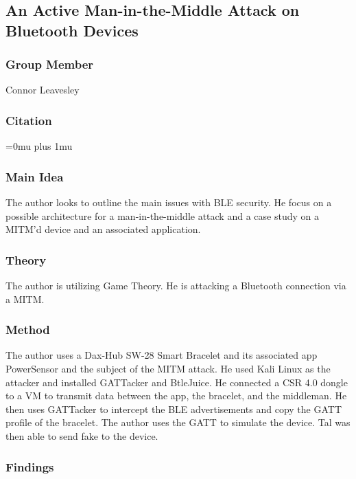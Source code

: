 \noindent
\subsection{An Active Man-in-the-Middle Attack on Bluetooth Devices}

\subsubsection{Group Member}

\noindent
Connor Leavesley

\noindent
\subsubsection{Citation}

\Urlmuskip=0mu plus 1mu\relax

\subsubsection{Main Idea}

\noindent
The author looks to outline the main issues with BLE security. He focus on a possible architecture for a man-in-the-middle attack and a case study on a MITM'd device and an associated application. 

\subsubsection{Theory}

\noindent
The author is utilizing Game Theory. He is attacking a Bluetooth connection via a MITM. 

\subsubsection{Method}

\noindent
The author uses a Dax-Hub SW-28 Smart Bracelet and its associated app PowerSensor and the subject of the MITM attack. He used Kali Linux as the attacker and installed GATTacker and BtleJuice. He connected a CSR 4.0 dongle to a VM to transmit data between the app, the bracelet, and the middleman. He then uses GATTacker to intercept the BLE advertisements and copy the GATT profile of the bracelet. The author uses the GATT to simulate the device. Tal was then able to send fake to the device. 

\subsubsection{Findings}

